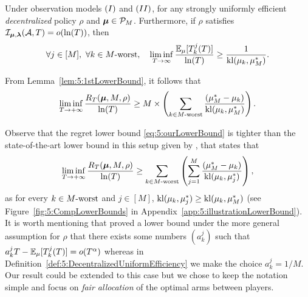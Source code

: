 \begin{theorem}\label{thm:5:BetterLowerBound}
  Under observation models $(I)$ and $(II)$, for any strongly uniformly efficient \emph{decentralized} policy $\rho$ and $\boldsymbol{\mu}\in\mathcal{P}_M$.
  Furthermore, if $\rho$ satisfies $\mathcal{I}_{\bm{\mu},\bm{\lambda}}(\mathcal{A},T) = \mathop{}\mathopen{}o\mathopen{}\left(\ln(T)\right)$, then
  \begin{equation}\label{eq:5:LBDraws}
    \forall j \in [M], \ \forall k \in M\text{-}\mathrm{worst}, \ \ \ \liminf_{T\to \infty} \frac{\mathbb{E}_{\mu}[T_k^j(T)]}{\ln(T)} \geq \frac{1}{\mathrm{kl}(\mu_k, \mu_M^*)}.
  \end{equation}

  \noindent From Lemma~\ref{lem:5:1stLowerBound}, it follows that
  \begin{equation}\label{eq:5:ourLowerBound}
    \mathop{\lim\inf}\limits_{T \to +\infty} \frac{R_T(\boldsymbol{\mu}, M, \rho)}{\ln(T)}
    \geq M \times \left( \sum_{k \in M\text{-}\mathrm{worst}} \frac{(\mu_M^* -  \mu_k)}{\mathrm{kl}(\mu_k, \mu_M^*)} \right) .
  \end{equation}
\end{theorem}


Observe that the regret lower bound \eqref{eq:5:ourLowerBound} is tighter than the state-of-the-art lower bound in this setup
given by \cite{Zhao10}, that states that
\begin{equation}\label{eq:5:Zhao10LowerBound}
  \mathop{\lim\inf}\limits_{T \to +\infty} \frac{R_T(\boldsymbol{\mu}, M, \rho)}{\ln(T)}
  \geq \sum_{k \in M\text{-}\mathrm{worst}} \left( \sum_{j=1}^{M} \frac{(\mu_M^* -  \mu_k)}{\mathrm{kl}(\mu_k, \mu_{j}^*)} \right),
\end{equation}
as for every $k \in M\text{-}\mathrm{worst}$ and $j \in [M]$, $\mathrm{kl}(\mu_k, \mu_j^*) \geq \mathrm{kl}(\mu_k, \mu_M^*)$
(see Figure~\ref{fig:5:CompLowerBounds} in Appendix~\ref{app:5:illustrationLowerBound}).
%
It is worth mentioning that \cite{Zhao10} proved a lower bound under the more general assumption for $\rho$ that there exists some numbers $(a_{k}^j)$ such that $a_{k}^j T - \mathbb{E}_{\mu}[T_k^j(T)] = o(T^\alpha)$ whereas in Definition~\ref{def:5:DecentralizedUniformEfficiency} we make the choice $a_{k}^j = 1/M$.
Our result could be extended to this case but we chose to keep the notation simple and focus on \emph{fair allocation} of the optimal arms between players.


